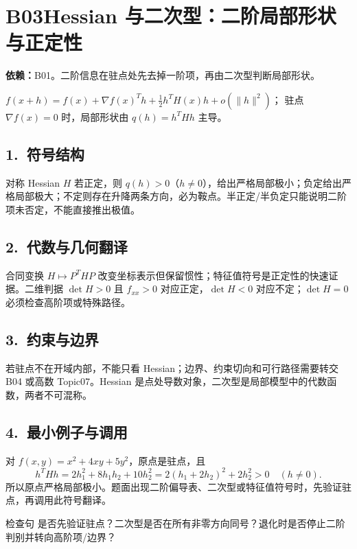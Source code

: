 \documentclass[UTF8,a4paper,10pt]{ctexart}
\begin{document}
\section*{B03\quad Hessian 与二次型：二阶局部形状与正定性}
\textbf{依赖：}B01。二阶信息在驻点处先去掉一阶项，再由二次型判断局部形状。
\begin{tcolorbox}[title=母接口]
$f(x+h)=f(x)+\nabla f(x)^Th+\frac12h^TH(x)h+o(\|h\|^2)$；
驻点 $\nabla f(x)=0$ 时，局部形状由 $q(h)=h^THh$ 主导。
\end{tcolorbox}
\subsection*{1.\ 符号结构}
对称 Hessian $H$ 若正定，则 $q(h)>0$（$h\ne0$），给出严格局部极小；负定给出严格局部极大；不定则存在升降两条方向，必为鞍点。半正定/半负定只能说明二阶项未否定，不能直接推出极值。
\subsection*{2.\ 代数与几何翻译}
合同变换 $H\mapsto P^THP$ 改变坐标表示但保留惯性；特征值符号是正定性的快速证据。二维判据 $\det H>0$ 且 $f_{xx}>0$ 对应正定，$\det H<0$ 对应不定；$\det H=0$ 必须检查高阶项或特殊路径。
\subsection*{3.\ 约束与边界}
若驻点不在开域内部，不能只看 Hessian；边界、约束切向和可行路径需要转交 B04 或高数 Topic07。Hessian 是点处导数对象，二次型是局部模型中的代数函数，两者不可混称。
\subsection*{4.\ 最小例子与调用}
对 $f(x,y)=x^2+4xy+5y^2$，原点是驻点，且
\[
h^THh=2h_1^2+8h_1h_2+10h_2^2
=2(h_1+2h_2)^2+2h_2^2>0\quad(h\ne0).
\]
所以原点严格局部极小。题面出现二阶偏导表、二次型或特征值符号时，先验证驻点，再调用此符号翻译。
\begin{corebox}{检查句}
是否先验证驻点？二次型是否在所有非零方向同号？退化时是否停止二阶判别并转向高阶项/边界？
\end{corebox}
\end{document}
